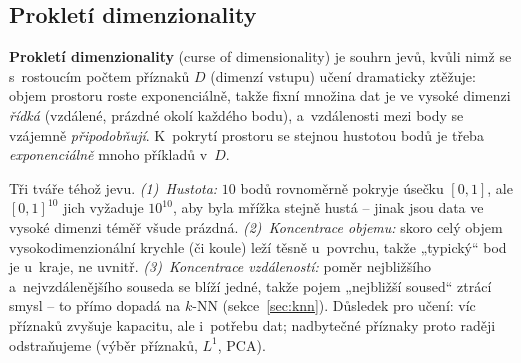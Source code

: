 \begin{center}
\end{center}

\subsection{Prokletí dimenzionality}

\begin{definice}
\textbf{Prokletí dimenzionality} (curse of dimensionality) je souhrn jevů, kvůli nimž se s~rostoucím počtem příznaků $D$ (dimenzí vstupu) učení dramaticky ztěžuje: objem prostoru roste exponenciálně, takže fixní množina dat je ve vysoké dimenzi \emph{řídká} (vzdálené, prázdné okolí každého bodu), a~vzdálenosti mezi body se vzájemně \emph{připodobňují}. K~pokrytí prostoru se stejnou hustotou bodů je třeba \emph{exponenciálně} mnoho příkladů v~$D$.
\end{definice}

\begin{intuice}
Tři tváře téhož jevu. \emph{(1)~Hustota:} $10$ bodů rovnoměrně pokryje úsečku $[0,1]$, ale $[0,1]^{10}$ jich vyžaduje $10^{10}$, aby byla mřížka stejně hustá -- jinak jsou data ve vysoké dimenzi téměř všude prázdná. \emph{(2)~Koncentrace objemu:} skoro celý objem vysokodimenzionální krychle (či koule) leží těsně u~povrchu, takže „typický`` bod je u~kraje, ne uvnitř. \emph{(3)~Koncentrace vzdáleností:} poměr nejbližšího a~nejvzdálenějšího souseda se blíží jedné, takže pojem „nejbližší soused`` ztrácí smysl -- to přímo dopadá na $k$-NN (sekce~\ref{sec:knn}). Důsledek pro učení: víc příznaků zvyšuje kapacitu, ale i~potřebu dat; nadbytečné příznaky proto raději odstraňujeme (výběr příznaků, $L^1$, PCA).
\end{intuice}

